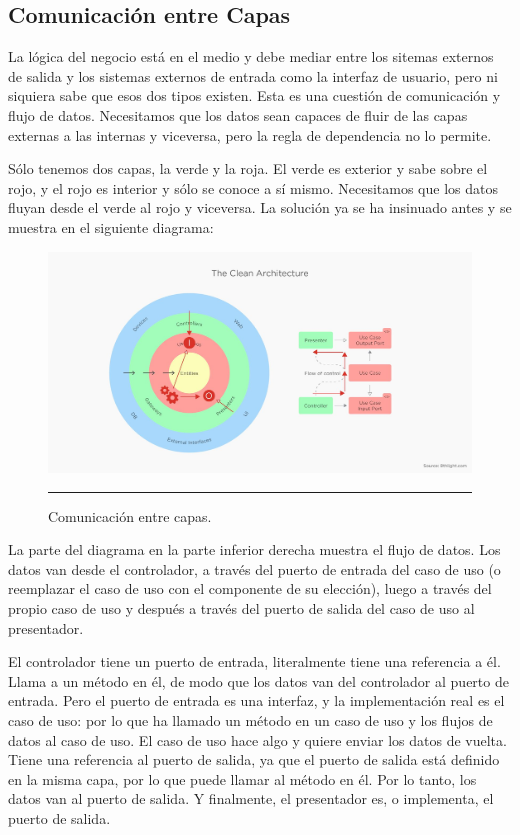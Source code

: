 \subsection{Comunicación entre Capas}
La lógica del negocio está en el medio y debe mediar entre los sitemas externos de salida y los sistemas externos de entrada como la interfaz de usuario, pero ni siquiera sabe que esos dos tipos existen. Esta es una cuestión de comunicación y flujo de datos. Necesitamos que los datos sean capaces de fluir de las capas externas a las internas y viceversa, pero la regla de dependencia no lo permite.

Sólo tenemos dos capas, la verde y la roja. El verde es exterior y sabe sobre el rojo, y el rojo es interior y sólo se conoce a sí mismo. Necesitamos que los datos fluyan desde el verde al rojo y viceversa. La solución ya se ha insinuado antes y se muestra en el siguiente diagrama:

\begin{figure}[htbp]
	\centering
	\includegraphics[width=1\textwidth]{Figures/-004.png}
	\rule{35em}{1pt}
	\caption[Layer Communication]{Comunicación entre capas.}
	\label{fig:C2_CC_01}
\end{figure}

La parte del diagrama en la parte inferior derecha muestra el flujo de datos. Los datos van desde el controlador, a través del puerto de entrada del caso de uso (o reemplazar el caso de uso con el componente de su elección), luego a través del propio caso de uso y después a través del puerto de salida del caso de uso al presentador.

El controlador tiene un puerto de entrada, literalmente tiene una referencia a él. Llama a un método en él, de modo que los datos van del controlador al puerto de entrada. Pero el puerto de entrada es una interfaz, y la implementación real es el caso de uso: por lo que ha llamado un método en un caso de uso y los flujos de datos al caso de uso. El caso de uso hace algo y quiere enviar los datos de vuelta. Tiene una referencia al puerto de salida, ya que el puerto de salida está definido en la misma capa, por lo que puede llamar al método en él. Por lo tanto, los datos van al puerto de salida. Y finalmente, el presentador es, o implementa, el puerto de salida.

